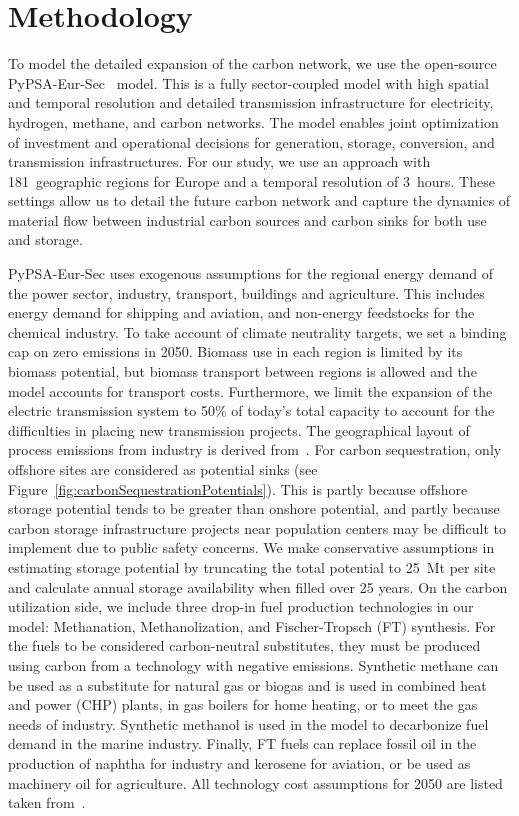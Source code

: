 \documentclass[conference]{IEEEtran}
\begin{document}
\section{Methodology}
\label{sec:methodology}

To model the detailed expansion of the carbon network, we use the open-source PyPSA-Eur-Sec~\cite{PyPSAEurSecSectorCoupledOpen2023} model. This is a fully sector-coupled model with high spatial and temporal resolution and detailed transmission infrastructure for electricity, hydrogen, methane, and carbon networks. The model enables joint optimization of investment and operational decisions for generation, storage, conversion, and transmission infrastructures. For our study, we use an approach with 181~geographic regions for Europe and a temporal resolution of 3~hours. These settings allow us to detail the future carbon network and capture the dynamics of material flow between industrial carbon sources and carbon sinks for both use and storage.

PyPSA-Eur-Sec uses exogenous assumptions for the regional energy demand of the power sector, industry, transport, buildings and agriculture. This includes energy demand for shipping and aviation, and non-energy feedstocks for the chemical industry. To take account of climate neutrality targets, we set a binding cap on zero emissions in 2050. Biomass use in each region is limited by its biomass potential, but biomass transport between regions is allowed and the model accounts for transport costs. Furthermore, we limit the expansion of the electric transmission system to 50\% of today's total capacity to account for the difficulties in placing new transmission projects. The geographical layout of process emissions from industry is derived from~\cite{piamanzGeoreferencedIndustrialSites2018}. For carbon sequestration, only offshore sites are considered as potential sinks (see Figure~\ref{fig:carbonSequestrationPotentials}). This is partly because offshore storage potential tends to be greater than onshore potential, and partly because carbon storage infrastructure projects near population centers may be difficult to implement due to public safety concerns. We make conservative assumptions in estimating storage potential by truncating the total potential to 25~Mt per site and calculate annual storage availability when filled over 25 years.
On the carbon utilization side, we include three drop-in fuel production technologies in our model: Methanation, Methanolization, and Fischer-Tropsch (FT) synthesis. For the fuels to be considered carbon-neutral substitutes, they must be produced using carbon from a technology with negative emissions. Synthetic methane can be used as a substitute for natural gas or biogas and is used in combined heat and power (CHP) plants, in gas boilers for home heating, or to meet the gas needs of industry. Synthetic methanol is used in the model to decarbonize fuel demand in the marine industry. Finally, FT fuels can replace fossil oil in the production of naphtha for industry and kerosene for aviation, or be used as machinery oil for agriculture.
All technology cost assumptions for 2050 are listed taken from~\cite{lisazeyenPyPSATechnologydataTechnology2023}.
\end{document}
